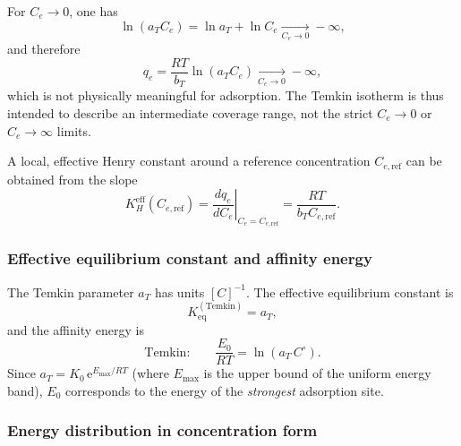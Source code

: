 \documentclass[12pt]{article}
\begin{document}
	For $C_e \to 0$, one has
	\[
	\ln(a_T C_e) = \ln a_T + \ln C_e \xrightarrow[C_e \to 0]{} -\infty,
	\]
	and therefore
	\[
	q_e = \frac{RT}{b_T} \ln(a_T C_e) \xrightarrow[C_e \to 0]{} -\infty,
	\]
	which is not physically meaningful for adsorption. The Temkin isotherm is thus intended to describe an intermediate coverage range, not the strict $C_e \to 0$ or $C_e \to \infty$ limits.
	
	A local, effective Henry constant around a reference concentration $C_{e,\mathrm{ref}}$ can be obtained from the slope
	\[
	K_H^{\mathrm{eff}}(C_{e,\mathrm{ref}})
	= \left.\frac{d q_e}{d C_e}\right|_{C_e = C_{e,\mathrm{ref}}}
	= \frac{RT}{b_T C_{e,\mathrm{ref}}}.
	\]

	\subsubsection{Effective equilibrium constant and affinity energy}

	The Temkin parameter $a_T$ has units $[C]^{-1}$. The effective
	equilibrium constant is
	\begin{equation}
		K_{\mathrm{eq}}^{\mathrm{(Temkin)}} = a_T,
	\end{equation}
	and the affinity energy is
	\begin{equation}
		\text{Temkin:}\qquad
		\frac{E_0}{RT} = \ln(a_T\,C^\circ).
		\label{eq:E_temkin}
	\end{equation}
	Since $a_T = K_0\,\mathrm{e}^{E_{\max}/RT}$ (where $E_{\max}$ is the
	upper bound of the uniform energy band), $E_0$ corresponds to the
	energy of the \emph{strongest} adsorption site.

	\subsubsection{Energy distribution in concentration form}
\end{document}

